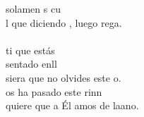 \begin{cancion}
	solamen s cu  \\
	l que diciendo , luego rega.\\
	\jump\\
	ti que estás \\
	sentado enll  \\
	siera que no olvides este o.\\
	os ha pasado  este rinn \\
	quiere que a Él amos de laano.\\
\end{cancion}%
